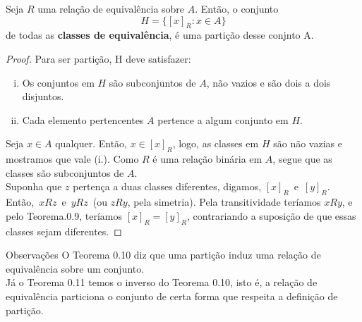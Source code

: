 \begin{theorem}
  Seja $R$ uma relação de equivalência sobre $A$. Então, o conjunto
  $$H = \{[x]_{R}: x \in A\}$$
  de todas as \textbf{classes de equivalência}, é uma partição desse conjnto A.  
\end{theorem}
\begin{proof}
  Para ser partição, H deve satisfazer:
    \begin{enumerate}[i.]
        \item Os conjuntos em $H$ são subconjuntos de $A$, não vazios e são dois a dois disjuntos.
        \item Cada elemento pertencentes $A$ pertence a algum conjunto em $H$.
    \end{enumerate}
    Seja $x \in A$ qualquer. Então, $x \in [x]_{R}$, logo, as classes em $H$ são não vazias e mostramos que vale (i.). Como $R$ é uma relação binária em $A$, segue que as classes são subconjuntos de $A$.\\
    Suponha que $z$ pertença a duas classes diferentes, digamos, $[x]_{R}$\ e\ $[y]_{R}$. Então,\ $xRz$\ e\ $yRz$\ (ou $zRy$, pela simetria). Pela transitividade teríamos $xRy$, e pelo Teorema.0.9, teríamos $[x]_{R} = [y]_{R}$, contrariando a suposição de que essas classes sejam diferentes.
\end{proof}
\begin{mymdframed}{Observações}
  O Teorema 0.10 diz que uma partição induz uma relação de equivalência sobre um conjunto.\\
  Já o Teorema 0.11 temos o inverso do Teorema 0.10, isto é, a relação de equivalência particiona o conjunto de certa forma que respeita a definição de partição.
\end{mymdframed}

